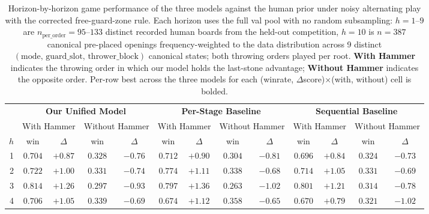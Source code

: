 \documentclass[11pt]{article}
\begin{document}
\begin{table}[ht]
\centering
\caption{Horizon-by-horizon game performance of the three models against
the human prior under noisy alternating play with the corrected
free-guard-zone rule. Each horizon uses the full val pool with no random
subsampling: $h{=}1$--$9$ are $n_{\text{per\_order}}=95$--$133$ distinct
recorded human boards from the held-out competition, $h{=}10$ is $n=387$
canonical pre-placed openings frequency-weighted to the data distribution
across 9 distinct $(\text{mode},\,\text{guard\_slot},\,\text{thrower\_block})$
canonical states; both throwing orders played per root. \textbf{With Hammer}
indicates the throwing order in which our model holds the last-stone
advantage; \textbf{Without Hammer} indicates the opposite order. Per-row
best across the three models for each (winrate, $\Delta$score)$\times$(with,
without) cell is bolded.}
\label{tab:horizons}
\footnotesize
\setlength{\tabcolsep}{3pt}
\renewcommand{\arraystretch}{1.1}
\begin{tabular}{r cccc | cccc | cccc}
\hline
 & \multicolumn{4}{c|}{\textbf{Our Unified Model}} & \multicolumn{4}{c|}{\textbf{Per-Stage Baseline}} & \multicolumn{4}{c}{\textbf{Sequential Baseline}} \\
 \cline{2-13}
 & \multicolumn{2}{c}{With Hammer} & \multicolumn{2}{c|}{Without Hammer} & \multicolumn{2}{c}{With Hammer} & \multicolumn{2}{c|}{Without Hammer} & \multicolumn{2}{c}{With Hammer} & \multicolumn{2}{c}{Without Hammer} \\
 \cline{2-13}
$h$ & win & $\Delta$ & win & $\Delta$ & win & $\Delta$ & win & $\Delta$ & win & $\Delta$ & win & $\Delta$ \\
\hline
 1  & $0.704$           & $+0.87$           & $\mathbf{0.328}$  & $-0.76$           & $\mathbf{0.712}$  & $\mathbf{+0.90}$  & $0.304$           & $-0.81$           & $0.696$           & $+0.84$           & $0.324$           & $\mathbf{-0.73}$  \\
 2  & $0.722$           & $+1.00$           & $0.331$           & $-0.74$           & $\mathbf{0.774}$  & $\mathbf{+1.11}$  & $\mathbf{0.338}$  & $\mathbf{-0.68}$  & $0.714$           & $+1.05$           & $0.331$           & $-0.69$           \\
 3  & $\mathbf{0.814}$  & $+1.26$           & $0.297$           & $-0.93$           & $0.797$           & $\mathbf{+1.36}$  & $0.263$           & $-1.02$           & $0.801$           & $+1.21$           & $\mathbf{0.314}$  & $\mathbf{-0.78}$  \\
 4  & $\mathbf{0.706}$  & $+1.05$           & $0.339$           & $-0.69$           & $0.674$           & $\mathbf{+1.12}$  & $\mathbf{0.358}$  & $\mathbf{-0.65}$  & $0.670$           & $+0.79$           & $0.321$           & $-1.02$           \\

\end{tabular}
\end{table}
\end{document}
